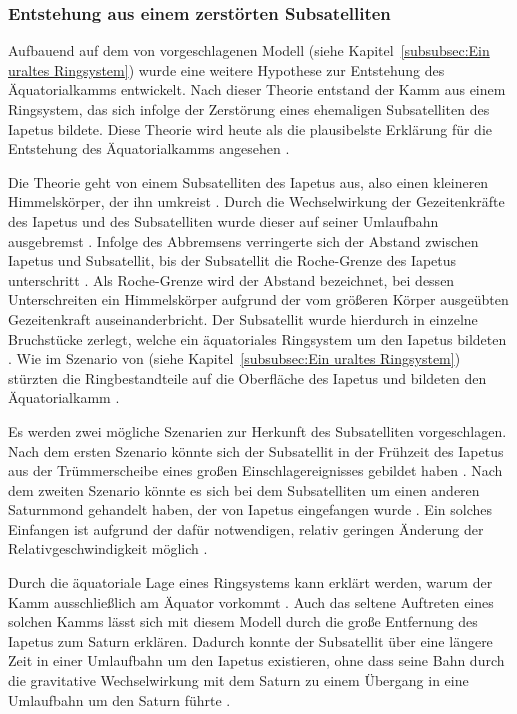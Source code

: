 \documentclass[a4paper,11pt]{article}
\newcommand{\mysubsubsection}[1]{\subsubsection{#1}\label{subsubsec:#1}}
\begin{document}
\mysubsubsection{Entstehung aus einem zerstörten Subsatelliten}

Aufbauend auf dem von \citeauthor{Ip_2006}  vorgeschlagenen Modell (siehe Kapitel~\ref{subsubsec:Ein uraltes Ringsystem})
wurde eine weitere Hypothese zur Entstehung des Äquatorialkamms entwickelt.
Nach dieser Theorie entstand der Kamm aus einem Ringsystem,
das sich infolge der Zerstörung eines ehemaligen Subsatelliten des Iapetus bildete.
Diese Theorie wird heute als die plausibelste Erklärung für die Entstehung des
Äquatorialkamms angesehen \parencite[143]{Damptz_2018}.

Die Theorie geht von einem Subsatelliten des Iapetus aus, also einen kleineren Himmelskörper,
der ihn umkreist \parencite[5]{Dombard_2012}. 
Durch die Wechselwirkung der Gezeitenkräfte des Iapetus und des Subsatelliten
wurde dieser auf seiner Umlaufbahn ausgebremst \parencite[5, 6]{Dombard_2012}.
Infolge des Abbremsens verringerte sich der Abstand zwischen Iapetus und Subsatellit,
bis der Subsatellit die Roche-Grenze des Iapetus unterschritt \parencite[6]{Dombard_2012}.
Als Roche-Grenze wird der Abstand bezeichnet, bei dessen Unterschreiten ein Himmelskörper aufgrund
der vom größeren Körper ausgeübten Gezeitenkraft auseinanderbricht. 
Der Subsatellit wurde hierdurch in einzelne Bruchstücke zerlegt,
welche ein äquatoriales Ringsystem um den Iapetus bildeten \parencite[6]{Dombard_2012}.
Wie im Szenario von \citeauthor{Ip_2006} (siehe Kapitel~\ref{subsubsec:Ein uraltes Ringsystem})
stürzten die Ringbestandteile auf die Oberfläche des Iapetus und bildeten den Äquatorialkamm \parencite[6]{Dombard_2012}.

Es werden zwei mögliche Szenarien zur Herkunft des Subsatelliten vorgeschlagen.
Nach dem ersten Szenario könnte sich der Subsatellit in der Frühzeit des Iapetus aus der Trümmerscheibe
eines großen Einschlagereignisses gebildet haben \parencite[5]{Dombard_2012}.
Nach dem zweiten Szenario könnte es sich bei dem Subsatelliten um einen anderen Saturnmond
gehandelt haben, der von Iapetus eingefangen wurde \parencite[5]{Dombard_2012}.
Ein solches Einfangen ist aufgrund der dafür notwendigen, relativ geringen Änderung
der Relativgeschwindigkeit möglich \parencite[5]{Dombard_2012}.

Durch die äquatoriale Lage eines Ringsystems kann erklärt werden,
warum der Kamm ausschließlich am Äquator vorkommt \parencite[6]{Dombard_2012}.
Auch das seltene Auftreten eines solchen Kamms lässt sich mit diesem Modell durch
die große Entfernung des Iapetus zum Saturn erklären.
Dadurch konnte der Subsatellit über eine längere Zeit in einer Umlaufbahn um den Iapetus existieren,
ohne dass seine Bahn durch die gravitative Wechselwirkung mit dem Saturn zu einem
Übergang in eine Umlaufbahn um den Saturn führte \parencite[6]{Dombard_2012}.
\end{document}
